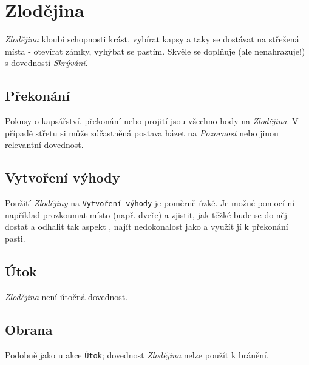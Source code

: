 \documentclass[../main.tex]{subfiles}
\begin{document}
\section{Zlodějina}
\label{sec:zlodejina}

\textit{Zlodějina} kloubí schopnosti krást, vybírat kapsy a taky se dostávat na střežená místa - otevírat zámky, vyhýbat se pastím. Skvěle se doplňuje (ale nenahrazuje!) s dovedností \textit{Skrývání}.

\subsection*{Překonání} \prekonani
\label{subsec:zlodejina-prekonani}


Pokusy o kapsářství, překonání  nebo projití  jsou všechno hody na \textit{Zlodějina}. V případě střetu si může zúčastněná postava házet na \textit{Pozornost} nebo jinou relevantní dovednost.

\subsection*{Vytvoření výhody} \vytvoreni
\label{subsec:zlodejina-vytvoreni}


Použití \textit{Zlodějiny} na \texttt{Vytvoření výhody} je poměrně úzké. Je možné pomocí ní například prozkoumat místo (např. dveře) a zjistit, jak těžké bude se do něj dostat a odhalit tak aspekt , najít nedokonalost jako  a využít jí k překonání pasti. 

\subsection*{Útok} \utok
\label{subsec:zlodejina-utok}


\textit{Zlodějina} není útočná dovednost.

\subsection*{Obrana} \obrana
\label{subsec:zlodejina-obrana}


Podobně jako u akce \texttt{Útok}; dovednost \textit{Zlodějina} nelze použít k bránění.
\end{document}
